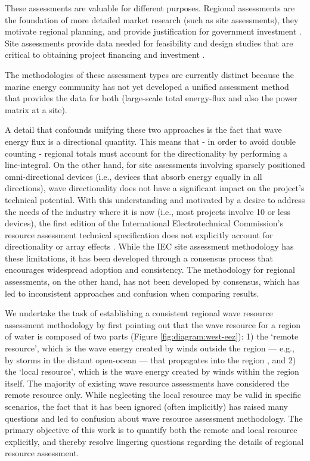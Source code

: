 These assessments are valuable for different purposes. Regional assessments are the foundation of more detailed market research (such as site assessments), they motivate regional planning, and provide justification for government investment \citep[e.g., ][]{EPRIwaveresource2011,gunnQuantifyingGlobalWave2012,regueroGlobalWavePower2015,motaWaveEnergyPotential2014}. Site assessments provide data needed for feasibility and design studies that are critical to obtaining project financing and investment \citep[]{robertsonCharacterizingShoreWave2014,iglesiasWaveEnergyPotential2009}.

The methodologies of these assessment types are currently distinct because the marine energy community has not yet developed a unified assessment method that provides the data for both (large-scale total energy-flux and also the power matrix at a site). 

A detail that confounds unifying these two approaches is the fact that wave energy flux is a directional quantity. This means that - in order to avoid double counting - regional totals must account for the directionality by performing a line-integral. On the other hand, for site assessments involving sparsely positioned omni-directional devices (i.e., devices that absorb energy equally in all directions), wave directionality does not have a significant impact on the project’s technical potential. With this understanding and motivated by a desire to address the needs of the industry where it is now (i.e., most projects involve 10 or less devices), the first edition of the International Electrotechnical Commission’s resource assessment technical specification does not explicitly account for directionality or array effects \citep[]{internationalelectrotechnicalcommissionPart101Wave2015}. While the IEC site assessment methodology has these limitations, it has been developed through a consensus process that encourages widespread adoption and consistency. The methodology for regional assessments, on the other hand, has not been developed by consensus, which has led to inconsistent approaches and confusion when comparing results.

We undertake the task of establishing a consistent regional wave resource assessment methodology by first pointing out that the wave resource for a region of water is composed of two parts (Figure \ref{fig:diagram:west-eez}): 1) the ‘remote resource’, which is the wave energy created by winds outside the region — e.g., by storms in the distant open-ocean — that propagates into the region \citep{gunnQuantifyingGlobalWave2012, hemerRevisedAssessmentAustralia2017}, and 2) the ‘local resource’, which is the wave energy created by winds within the region itself. The majority of existing wave resource assessments have considered the remote resource only. While neglecting the local resource may be valid in specific scenarios, the fact that it has been ignored (often implicitly) has raised many questions and led to confusion about wave resource assessment methodology. The primary objective of this work is to quantify both the remote and local resource explicitly, and thereby resolve lingering questions regarding the details of regional resource assessment.

